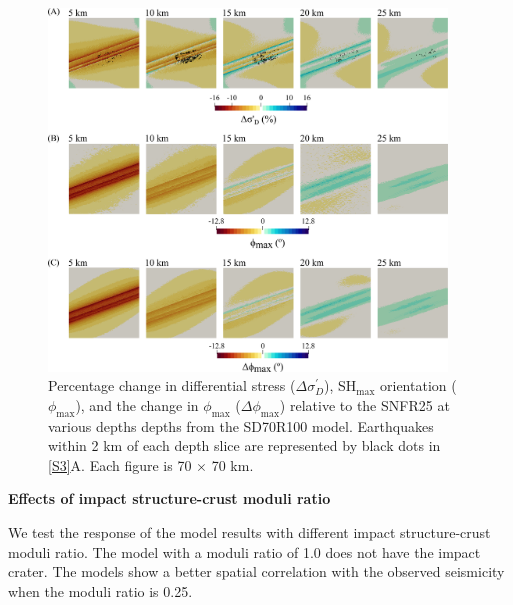 \documentclass[draft,jgrga]{agutexSI2019}
\begin{document}
\begin{article}
\begin{figure}[ht]
\includegraphics[width=25pc]{Figures/SD70R100_S1.png}
\caption{Percentage change in differential stress ($\Delta\sigma_{D}^{\prime}$), SH$_{\max}$ orientation ($\phi_{\max}$), and the change in $\phi_{\max}$ ($\Delta\phi_{\max}$) relative to the SNFR25 at various depths depths from the SD70R100 model. Earthquakes within 2 km of each depth slice are represented by black dots in \ref{S3}A. Each figure is 70 $\times$ 70 km.}
\label{S5}
\end{figure}

\vspace{10mm} %


\noindent\textbf{Effects of impact structure-crust moduli ratio}

We test the response of the model results with different impact structure-crust moduli ratio. The model with a moduli ratio of 1.0 does not have the impact crater. The models show a better spatial correlation with the observed seismicity when the moduli ratio is 0.25. 

\vspace{10mm} %


\end{article}
\end{document}
